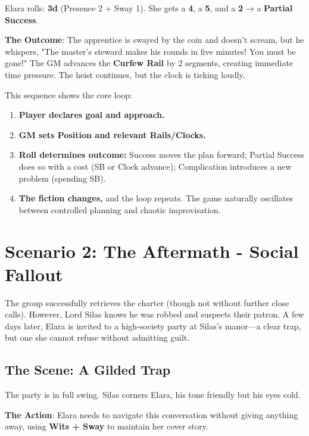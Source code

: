 Elara rolls: \textbf{3d} (Presence 2 + Sway 1). She gets a \textbf{4}, a \textbf{5}, and a \textbf{2} → a \textbf{Partial Success}.

\textbf{The Outcome}: The apprentice is swayed by the coin and doesn't scream, but he whispers, "The master's steward makes his rounds in five minutes! You must be gone!" The GM advances the \textbf{Curfew Rail} by 2 segments, creating immediate time pressure. The heist continues, but the clock is ticking loudly.

\begin{tcolorbox}[title=Heist Flow Summary, colback=blue!5!white, colframe=blue!75!black, fonttitle=\bfseries]
This sequence shows the core loop:
\begin{enumerate}
    \item \textbf{Player declares goal and approach.}
    \item \textbf{GM sets Position and relevant Rails/Clocks.}
    \item \textbf{Roll determines outcome:} Success moves the plan forward; Partial Success does so with a cost (SB or Clock advance); Complication introduces a new problem (spending SB).
    \item \textbf{The fiction changes,} and the loop repeats. The game naturally oscillates between controlled planning and chaotic improvisation.
\end{enumerate}
\end{tcolorbox}

\section*{Scenario 2: The Aftermath - Social Fallout}

The group successfully retrieves the charter (though not without further close calls). However, Lord Silas knows he was robbed and suspects their patron. A few days later, Elara is invited to a high-society party at Silas's manor—a clear trap, but one she cannot refuse without admitting guilt.

\subsection*{The Scene: A Gilded Trap}

The party is in full swing. Silas corners Elara, his tone friendly but his eyes cold.

\textbf{The Action}: Elara needs to navigate this conversation without giving anything away, using \textbf{Wits + Sway} to maintain her cover story.

